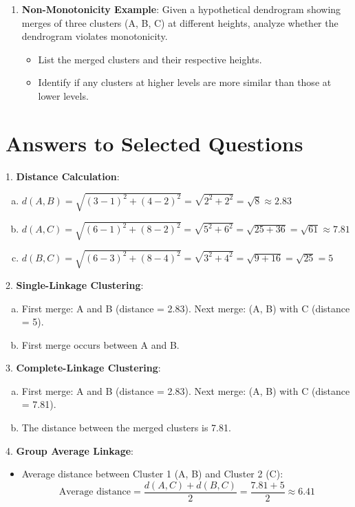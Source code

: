 \documentclass{article}
\begin{document}
\begin{enumerate}[1.]
    \item \textbf{Non-Monotonicity Example}:  
    Given a hypothetical dendrogram showing merges of three clusters (A, B, C) at different heights, analyze whether the dendrogram violates monotonicity.  
    \begin{itemize}
        \item List the merged clusters and their respective heights.  
        \item Identify if any clusters at higher levels are more similar than those at lower levels.
    \end{itemize}
\end{enumerate}

\newpage

\section*{Answers to Selected Questions}

1. \textbf{Distance Calculation}:
    \begin{enumerate}[(a)]
        \item \( d(A, B) = \sqrt{(3-1)^2 + (4-2)^2} = \sqrt{2^2 + 2^2} = \sqrt{8} \approx 2.83 \)  
        \item \( d(A, C) = \sqrt{(6-1)^2 + (8-2)^2} = \sqrt{5^2 + 6^2} = \sqrt{25 + 36} = \sqrt{61} \approx 7.81 \)  
        \item \( d(B, C) = \sqrt{(6-3)^2 + (8-4)^2} = \sqrt{3^2 + 4^2} = \sqrt{9 + 16} = \sqrt{25} = 5 \)
    \end{enumerate}

2. \textbf{Single-Linkage Clustering}:
    \begin{enumerate}[(a)]
        \item First merge: A and B (distance = 2.83).  
        Next merge: (A, B) with C (distance = 5).
        \item First merge occurs between A and B.
    \end{enumerate}

3. \textbf{Complete-Linkage Clustering}:
    \begin{enumerate}[(a)]
        \item First merge: A and B (distance = 2.83).  
        Next merge: (A, B) with C (distance = 7.81).
        \item The distance between the merged clusters is 7.81.
    \end{enumerate}

4. \textbf{Group Average Linkage}:
    \begin{itemize}
        \item Average distance between Cluster 1 (A, B) and Cluster 2 (C):
        \[
        \text{Average distance} = \frac{d(A,C) + d(B,C)}{2} = \frac{7.81 + 5}{2} \approx 6.41
        \]
    \end{itemize}
\end{document}
